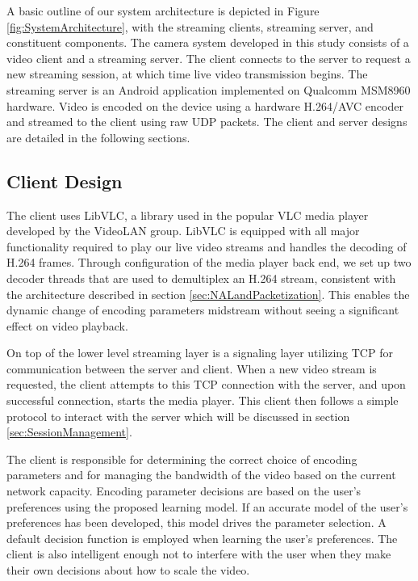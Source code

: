 A basic outline of our system architecture is depicted in Figure \ref{fig:SystemArchitecture}, with the streaming clients, streaming server, and constituent components. The camera system developed in this study consists of a video client and a streaming server. The client connects to the server to request a new streaming session, at which time live video transmission begins. The streaming server is an Android application implemented on Qualcomm MSM8960 hardware. Video is encoded on the device using a hardware H.264/AVC encoder and streamed to the client using raw UDP packets. The client and server designs are detailed in the following sections.

\subsection{Client Design}

The client uses LibVLC, a library used in the popular VLC media player developed by the VideoLAN group. LibVLC is equipped with all major functionality required to play our live video streams and handles the decoding of H.264 frames. Through configuration of the media player back end, we set up two decoder threads that are used to demultiplex an H.264 stream, consistent with the architecture described in section \ref{sec:NALandPacketization}. This enables the dynamic change of encoding parameters midstream without seeing a significant effect on video playback.

On top of the lower level streaming layer is a signaling layer utilizing TCP for communication between the server and client. When a new video stream is requested, the client attempts to this TCP connection with the server, and upon successful connection, starts the media player. This client then follows a simple protocol to interact with the server which will be discussed in section \ref{sec:SessionManagement}.

The client is responsible for determining the correct choice of encoding parameters and for managing the bandwidth of the video based on the current network capacity. Encoding parameter decisions are based on the user's preferences using the proposed learning model. If an accurate model of the user’s preferences has been developed, this model drives the parameter selection. A default decision function is employed when learning the user’s preferences. The client is also intelligent enough not to interfere with the user when they make their own decisions about how to scale the video.

